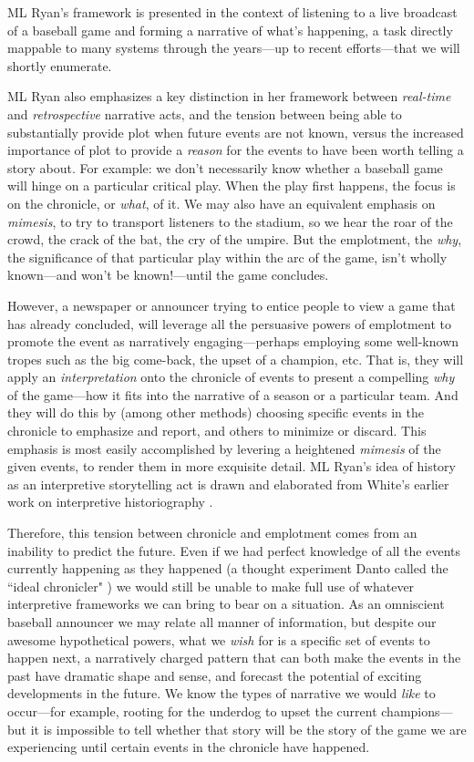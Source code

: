ML Ryan's framework is presented in the context of listening to a live broadcast of a baseball game and forming a narrative of what's happening, a task directly mappable to many systems through the years---up to recent efforts---that we will shortly enumerate.

ML Ryan also emphasizes a key distinction in her framework between \textit{real-time} and \textit{retrospective} narrative acts, and the tension between being able to substantially provide plot when future events are not known, versus the increased importance of plot to provide a \textit{reason} for the events to have been worth telling a story about. For example: we don't necessarily know whether a baseball game will hinge on a particular critical play. When the play first happens, the focus is on the chronicle, or \textit{what}, of it. We may also have an equivalent emphasis on \textit{mimesis}, to try to transport listeners to the stadium, so we hear the roar of the crowd, the crack of the bat, the cry of the umpire. But the emplotment, the \textit{why}, the significance of that particular play within the arc of the game, isn't wholly known---and won't be known!---until the game concludes.

However, a newspaper or announcer trying to entice people to view a game that has already concluded, will leverage all the persuasive powers of emplotment to promote the event as narratively engaging---perhaps employing some well-known tropes such as the big come-back, the upset of a champion, etc. That is, they will apply an \textit{interpretation} onto the chronicle of events to present a compelling \textit{why} of the game---how it fits into the narrative of a season or a particular team. And they will do this by (among other methods) choosing specific events in the chronicle to emphasize and report, and others to minimize or discard. This emphasis is most easily accomplished by levering a heightened \textit{mimesis} of the given events, to render them in more exquisite detail. ML Ryan's idea of history as an interpretive storytelling act is drawn and elaborated from White's earlier work on interpretive historiography \cite{white_1973}.

Therefore, this tension between chronicle and emplotment comes from an inability to predict the future. Even if we had perfect knowledge of all the events currently happening as they happened (a thought experiment Danto called the ``ideal chronicler" \cite{danto}) we would still be unable to make full use of whatever interpretive frameworks we can bring to bear on a situation. As an omniscient baseball announcer we may relate all manner of information, but despite our awesome hypothetical powers, what we \textit{wish} for is a specific set of events to happen next, a narratively charged pattern that can both make the events in the past have dramatic shape and sense, and forecast the potential of exciting developments in the future. We know the types of narrative we would \textit{like} to occur---for example, rooting for the underdog to upset the current champions---but it is impossible to tell whether that story will be the story of the game we are experiencing until certain events in the chronicle have happened.

